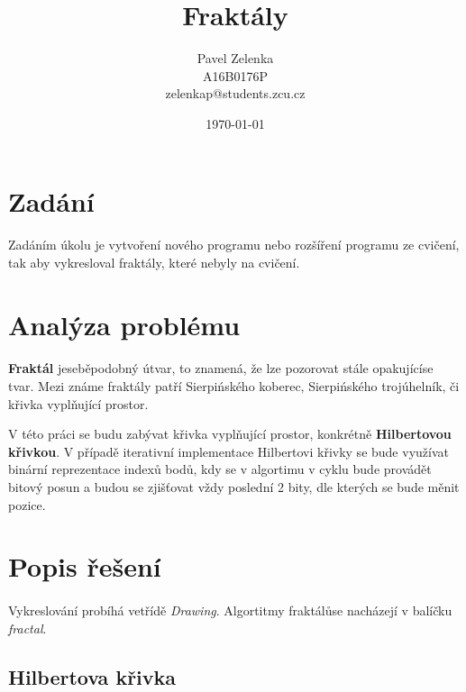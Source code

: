 \documentclass[12pt]{scrartcl}
\author{Pavel Zelenka\\A16B0176P\\zelenkap@students.zcu.cz}
\date{\today}
\title{Fraktály}
\begin{document}
\maketitle
{}
\newpage
{}
\newpage
\section{Zadání}
	
\paragraph{}
Zadáním úkolu je vytvoření nového programu nebo rozšíření programu ze cvičení, tak aby vykresloval fraktály, které nebyly na cvičení.

\section{Analýza problému}

\paragraph{}
\textbf{Fraktál} je\nobreakspace seběpodobný útvar, to znamená, že lze pozorovat stále opakující\nobreakspace se tvar. Mezi známe fraktály patří Sierpińského koberec, Sierpińského trojúhelník, či křivka vyplňující prostor.

V této práci se budu zabývat křivka vyplňující prostor, konkrétně \textbf{Hilbertovou křivkou}. V případě iterativní implementace Hilbertovi křivky se bude využívat binární reprezentace indexů bodů, kdy se v algortimu v cyklu bude provádět bitový posun a budou se zjišťovat vždy poslední 2 bity, dle kterých se bude měnit pozice.

\section{Popis řešení}

\paragraph{}
Vykreslování probíhá ve\nobreakspace třídě \emph{Drawing}. Algortitmy fraktálů\nobreakspace se nacházejí v balíčku \emph{fractal}.

\newpage
\subsection{Hilbertova křivka}
\end{document}
